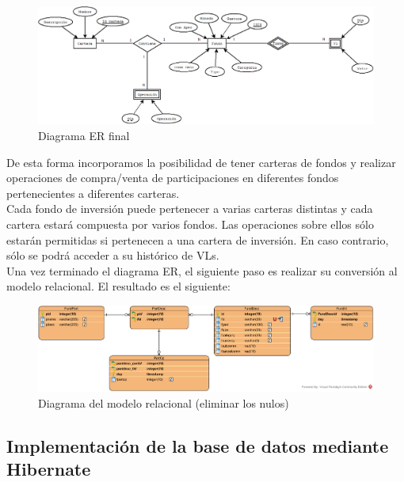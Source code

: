 \documentclass[12pt, a4paper]{article}
\begin{document}
\begin{figure}[htbp]
	\centering
	\includegraphics[width=\textwidth]{figuras/ERCompleto.png}
	\caption{Diagrama ER final}
	\label{fig:erfinal}
	\end {figure}



De esta forma incorporamos la posibilidad de tener carteras de fondos y realizar operaciones de compra/venta de participaciones en diferentes fondos pertenecientes a diferentes carteras.\\

Cada fondo de inversión puede pertenecer a varias carteras distintas y cada cartera estará compuesta por varios fondos. Las operaciones sobre ellos sólo estarán permitidas si pertenecen a una cartera de inversión. En caso contrario, sólo se podrá acceder a su histórico de \gls{VL}s.\\

Una vez terminado el diagrama \gls{ER}, el siguiente paso es realizar su conversión al modelo relacional. El resultado es el siguiente:\\

\begin{figure}[htbp]
	\centering
	\includegraphics[width=\textwidth]{figuras/DiagramaR.png}
	\caption{Diagrama del modelo relacional (eliminar los nulos)}
	\label{fig:relacional}
	\end {figure}
	
\newpage

\subsection{Implementación de la base de datos mediante Hibernate}
\end{document}
